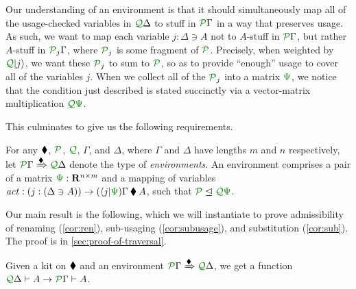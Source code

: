 \documentclass[submission,copyright,creativecommons]{eptcs}
\begin{document}
Our understanding of an environment is that it should simultaneously map all of
the usage-checked variables in $\ctx{\Delta}{Q}$ to stuff in $\ctx{\Gamma}{P}$
in a way that preserves usage.
As such, we want to map each variable $j : \Delta \ni A$ not to $A$-stuff in
$\ctx{\Gamma}{P}$, but rather $A$-stuff in $\resctx P_j\Gamma$,
where $\resctx P_j$ is some fragment of $\resctx P$.
Precisely, when weighted by $\resctx Q\lvert j \rangle$, we want these
$\resctx P_j$ to sum to $\resctx P$, so as to provide ``enough'' usage to cover
all of the variables $j$.
When we collect all of the $\resctx P_j$ into a matrix $\rescomment\Psi$, we
notice that the condition just described is stated succinctly via a
vector-matrix multiplication $\resctx Q\rescomment\Psi$.

This culminates to give us the following requirements.

\begin{definition}\label{def:env}
  For any $\mathbin{\blacklozenge}$, $\resctx P$, $\resctx Q$, $\Gamma$, and $\Delta$,
  where $\Gamma$ and $\Delta$ have lengths $m$ and $n$ respectively,
  let $\ctx{\Gamma}{P} \subst{\kitrel} \ctx{\Delta}{Q}$ denote the
  type of \emph{environments}.  An environment comprises a pair of a
  matrix $\rescomment\Psi : \mathbf R^{n \times m}$ and a mapping of
  variables
  $\mathit{act} : (j : (\Delta \ni A)) \to (\langle j
  \rvert\rescomment\Psi)\Gamma \kitrel A$, such that
  $\resctx P \subres \resctx Q \rescomment\Psi$.
\end{definition}

Our main result is the following, which we will instantiate to prove
admissibility of renaming (\autoref{cor:ren}), sub-usaging
(\autoref{cor:subusage}), and substitution (\autoref{cor:sub}). The
proof is in \autoref{sec:proof-of-traversal}.

\newcommand{\thmtrav}{%
  Given a kit on $\kitrel$ and an environment
  $\ctx{\Gamma}{P} \subst{\kitrel} \ctx{\Delta}{Q}$, we get a function
  $\ctx{\Delta}{Q} \vdash A \to \ctx{\Gamma}{P} \vdash A$.%
}
\begin{theorem}\label{thm:trav}
  \thmtrav
\end{theorem}
\end{document}
